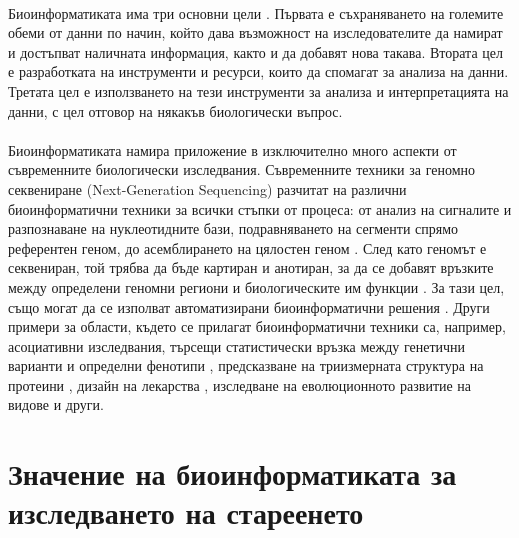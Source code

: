 \documentclass[pdftex,cyrillic,14pt,a4page,twoside,openright]{extreport}
\begin{document}
\paragraph{}
Биоинформатиката има три основни цели \cite{luscombe2001}. Първата е съхраняването на големите обеми от данни по начин, който дава възможност на изследователите да намират и достъпват наличната информация, както и да добавят нова такава. Втората цел е разработката на инструменти и ресурси, които да спомагат за анализа на данни. Третата цел е използването на тези инструменти за анализа и интерпретацията на данни, с цел отговор на някакъв биологически въпрос.

\paragraph{}
Биоинформатиката намира приложение в изключително много аспекти от съвременните биологически изследвания. Съвременните техники за геномно секвениране (Next-Generation Sequencing) разчитат на различни биоинформатични техники за всички стъпки от процеса: от анализ на сигналите и разпознаване на нуклеотидните бази, подравняването на сегменти спрямо референтен геном, до асемблирането на цялостен геном \cite{oliver2015}. След като геномът е секвениран, той трябва да бъде картиран и анотиран, за да се добавят връзките между определени геномни региони и биологическите им функции \cite{aken2016}. За тази цел, също могат да се изполват автоматизирани биоинформатични решения \cite{curwen2004}. Други примери за области, където се прилагат биоинформатични техники са, например, асоциативни изследвания, търсещи статистически връзка между генетични варианти и определни фенотипи \cite{moore2010}, предсказване на триизмерната структура на протеини \cite{alphafold2021}, дизайн на лекарства \cite{searls2000}, изследване на еволюционното развитие на видове \cite{diniz2017} и други.

\section[Значение на биоинформатиката за изследването на стареенето]{Значение на биоинформатиката за\\ изследването на стареенето}
\end{document}
